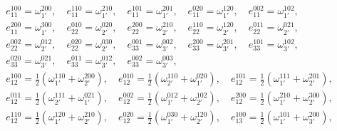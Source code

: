 \begin{gather}

e_{11}^{100}=\omega_{1'}^{200}, \quad  e_{11}^{110}=\omega_{1'}^{210}, \quad  

e_{11}^{101}=\omega_{1'}^{201}, \quad  e_{11}^{020}=\omega_{1'}^{120}, \quad  

e_{11}^{002}=\omega_{1'}^{102}, \\  

e_{11}^{200}=\omega_{1'}^{300}, \quad  e_{22}^{010}=\omega_{2'}^{020}, \quad  

e_{22}^{200}=\omega_{2'}^{210}, \quad  e_{22}^{110}=\omega_{2'}^{120}, \quad 

e_{22}^{011}=\omega_{2'}^{021}, \\ 

e_{22}^{002}=\omega_{2'}^{012}, \quad  e_{22}^{020}=\omega_{2'}^{030}, \quad 

e_{33}^{001}=\omega_{3'}^{002}, \quad  e_{33}^{200}=\omega_{3'}^{201}, \quad 

e_{33}^{101}=\omega_{3'}^{102}, \\ 

e_{33}^{020}=\omega_{3'}^{021}, \quad  e_{33}^{011}=\omega_{3'}^{012}, \quad  

e_{33}^{002}=\omega_{3'}^{003}, \\  

e_{12}^{100}=\frac{1}{2}(\omega_{1'}^{110}+\omega_{2'}^{200}), \quad  

e_{12}^{010}=\frac{1}{2}(\omega_{2'}^{110}+\omega_{1'}^{020}), \quad  

e_{12}^{101}=\frac{1}{2}(\omega_{1'}^{111}+\omega_{2'}^{201}),

\\

e_{12}^{011}=\frac{1}{2}(\omega_{2'}^{111}+\omega_{1'}^{021}), \quad  

e_{12}^{002}=\frac{1}{2}(\omega_{1'}^{012}+\omega_{2'}^{102}), \quad  

e_{12}^{200}=\frac{1}{2}(\omega_{1'}^{210}+\omega_{2'}^{300}),

\\

e_{12}^{110}=\frac{1}{2}(\omega_{1'}^{120}+\omega_{2'}^{210}), \quad  

e_{12}^{020}=\frac{1}{2}(\omega_{1'}^{030}+\omega_{2'}^{120}), \quad  

e_{13}^{100}=\frac{1}{2}(\omega_{1'}^{101}+\omega_{3'}^{200}),

\\


\end{gather}
